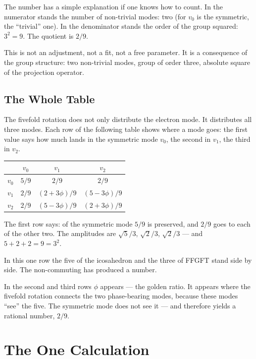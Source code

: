 \documentclass[12pt,oneside]{book}
\begin{document}
The number has a simple explanation if one knows how to count. In the numerator stands the number of non-trivial modes: two (for $v_0$ is the symmetric, the ``trivial'' one). In the denominator stands the order of the group squared: $3^2 = 9$. The quotient is $2/9$.

This is not an adjustment, not a fit, not a free parameter. It is a consequence of the group structure: two non-trivial modes, group of order three, absolute square of the projection operator.

\section{The Whole Table}

The fivefold rotation does not only distribute the electron mode. It distributes all three modes. Each row of the following table shows where a mode goes: the first value says how much lands in the symmetric mode $v_0$, the second in $v_1$, the third in $v_2$.

\begin{center}
\begin{tabular}{c|ccc}
\toprule
& $v_0$ & $v_1$ & $v_2$ \\
\midrule
$v_0$ & $5/9$ & $2/9$ & $2/9$ \\
$v_1$ & $2/9$ & $(2+3\phi)/9$ & $(5-3\phi)/9$ \\
$v_2$ & $2/9$ & $(5-3\phi)/9$ & $(2+3\phi)/9$ \\
\bottomrule
\end{tabular}
\end{center}

The first row says: of the symmetric mode $5/9$ is preserved, and $2/9$ goes to each of the other two. The amplitudes are $\sqrt{5}/3$, $\sqrt{2}/3$, $\sqrt{2}/3$ --- and $5 + 2 + 2 = 9 = 3^2$.

In this one row the five of the icosa\-hedron and the three of FFGFT stand side by side. The non-commuting has produced a number.

In the second and third rows $\phi$ appears --- the golden ratio. It appears where the fivefold rotation connects the two phase-bearing modes, because these modes ``see'' the five. The symmetric mode does not see it --- and therefore yields a rational number, $2/9$.

\chapter{The One Calculation}
\end{document}
